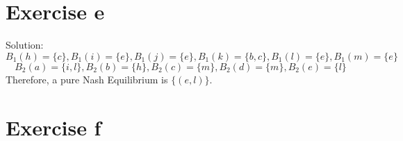 \documentclass[a4papers]{ctexart}
\begin{document}
\section*{Exercise e}
\noindent Solution:
\[ B_1(h)=\{ c\},B_1(i)=\{ e\},B_1(j)=\{ e\},B_1(k)=\{ b,c\},B_1(l)=\{ e\},B_1(m)=\{ e\}\]
\[ B_2(a)=\{ i,l\},B_2(b)=\{ h \},B_2(c)=\{ m\},B_2(d)=\{ m\},B_2(e)=\{ l\}\]
Therefore, a pure Nash Equilibrium is $\{ (e,l)\}.$

\section*{Exercise f}
\end{document}
